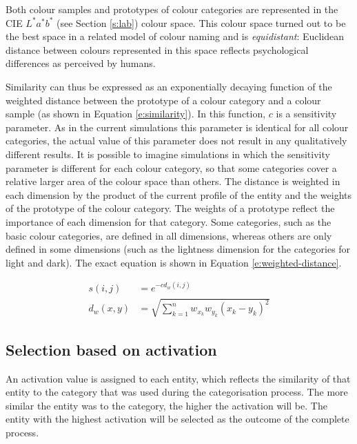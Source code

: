 Both colour samples and prototypes of colour categories are
represented in the CIE $L^*a^*b^*$ (see Section \ref{s:lab}) colour
space. This colour space turned out to be the best space in a related
model of colour naming \citep{lammens94computational} and is
\emph{equidistant}: Euclidean distance between colours represented in
this space reflects psychological differences as perceived by humans.

Similarity can thus be expressed as an exponentially decaying function
\citep{shepard87toward, gardenfors04conceptual} of the weighted
distance between the prototype of a colour category and a colour
sample (as shown in Equation \ref{e:similarity}). In this function,
$c$ is a sensitivity parameter. As in the current simulations this
parameter is identical for all colour categories, the actual value of
this parameter does not result in any qualitatively different
results. It is possible to imagine simulations in which the
sensitivity parameter is different for each colour category, so that some 
categories cover a relative larger area of the
colour space than others. The distance is weighted in each dimension by the
product of the current profile of the entity and the weights of the
prototype of the colour category. The weights of a prototype reflect
the importance of each dimension for that category. Some categories,
such as the basic colour categories, are defined in all dimensions,
whereas others are only defined in some dimensions (such as the
lightness dimension for the categories for light and dark). The exact
equation is shown in Equation \ref{e:weighted-distance}.

\begin{align}
s(i,j) &= e^{-cd_w(i,j)}
\label{e:similarity} \\
d_w(x,y) &= \sqrt{\sum_{k=1}^n w_{x_k}w_{y_k} (x_k - y_k)^2}
\label{e:weighted-distance}
\end{align}

\subsection{Selection based on activation}

An activation value is assigned to each entity, which reflects the
similarity of that entity to the category that was used during the
categorisation process. The more similar the entity was to the
category, the higher the activation will be. The entity with the
highest activation will be selected as the outcome of the complete
process.

